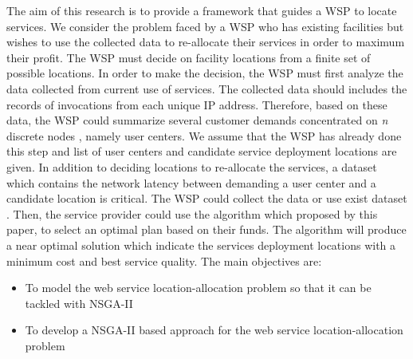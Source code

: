\documentclass{llncs}
\begin{document}
%
%

The aim of this research is to provide a framework that guides a WSP to locate services.
We consider the problem faced by a WSP who has existing facilities but wishes to use the collected data to re-allocate their services in order to maximum their profit.
The WSP must decide on facility locations from a finite set of possible locations. 
In order to make the decision, the WSP must first analyze the data collected from current use of services. 
The collected data should includes the records of invocations from each unique IP address.
Therefore, based on these data, the WSP could summarize several customer demands concentrated on \textit{n} discrete nodes \cite{Aboolian}, namely user centers. 
We assume that the WSP has already done this step and list of user centers and candidate service deployment locations are given.
In addition to deciding locations to re-allocate the services, a dataset which contains the network latency between demanding a user center and a candidate location is critical. 
The WSP could collect the data or use exist dataset  \cite{6076756} \cite{5552800}. 
Then, the service provider could use the algorithm which proposed by this paper, to select an optimal plan based on their funds. 
The algorithm will produce a near optimal solution which indicate the services deployment locations with a minimum cost and best service quality.
The main objectives are:
\begin{itemize}
	\item To model the web service location-allocation problem so that it can be tackled with NSGA-II
	\item To develop a NSGA-II based approach for the web service location-allocation problem
\end{itemize}
\end{document}
